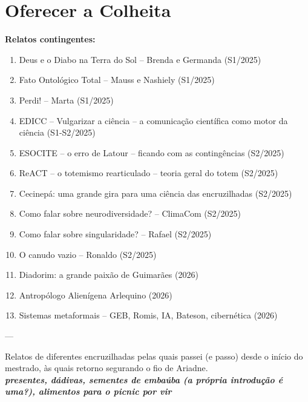 \chapter{Oferecer a Colheita}
\label{cap:colheita}

\textbf{Relatos contingentes:}
\begin{enumerate}[leftmargin=3cm]
\item Deus e o Diabo na Terra do Sol -- Brenda e Germanda (S1/2025)
\item Fato Ontológico Total -- Mauss e Nashiely (S1/2025)
\item Perdi! -- Marta (S1/2025)
\item EDICC -- Vulgarizar a ciência -- a comunicação científica como motor da ciência (S1-S2/2025)
\item ESOCITE -- o erro de Latour -- ficando com as contingências (S2/2025)
\item ReACT -- o totemismo rearticulado -- teoria geral do totem (S2/2025)
\item Cecinepá: uma grande gira para uma ciência das encruzilhadas (S2/2025)
\item Como falar sobre neurodiversidade? -- ClimaCom (S2/2025)
\item Como falar sobre singularidade? -- Rafael (S2/2025)
\item O canudo vazio -- Ronaldo (S2/2025)
\item Diadorim: a grande paixão de Guimarães (2026)
\item Antropólogo Alienígena Arlequino (2026)
\item Sistemas metaformais -- GEB, Romis, IA, Bateson, cibernética (2026)
\end{enumerate}
---

Relatos de diferentes encruzilhadas pelas quais passei (e passo) desde o início do mestrado, às quais retorno segurando o fio de Ariadne.\\

\textbf{\textit{presentes, dádivas, sementes de embaúba (a própria introdução é uma?), alimentos para o picnic por vir}}